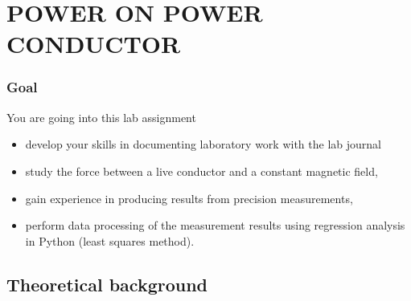 \documentclass[../Elmag-labhefte-2020.tex]{subfiles}
\begin{document}
\chapter{POWER ON POWER CONDUCTOR \label{ch.kraft}}

\subsection*{Goal}

You are going into this lab assignment
%
\begin{itemize}
 \item develop your skills in documenting laboratory work with the lab journal
    \item study the force between a live conductor and a constant magnetic field,
    \item gain experience in producing results from precision measurements,
    \item perform data processing of the measurement results using regression analysis in Python (least squares method). %
\end{itemize}
%


\section{Theoretical background}



\end{document}
